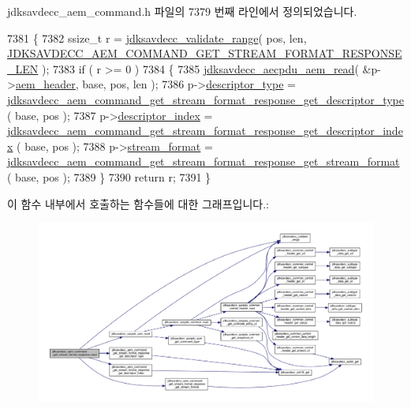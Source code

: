 jdksavdecc\+\_\+aem\+\_\+command.\+h 파일의 7379 번째 라인에서 정의되었습니다.


\begin{DoxyCode}
7381 \{
7382     ssize\_t r = \hyperlink{group__util_ga9c02bdfe76c69163647c3196db7a73a1}{jdksavdecc\_validate\_range}( pos, len, 
      \hyperlink{group__command__get__stream__format__response_gaeb316ba063dd01f9a1b11429a37e2af4}{JDKSAVDECC\_AEM\_COMMAND\_GET\_STREAM\_FORMAT\_RESPONSE\_LEN} 
      );
7383     \textcolor{keywordflow}{if} ( r >= 0 )
7384     \{
7385         \hyperlink{group__aecpdu__aem_gae2421015dcdce745b4f03832e12b4fb6}{jdksavdecc\_aecpdu\_aem\_read}( &p->\hyperlink{structjdksavdecc__aem__command__get__stream__format__response_ae1e77ccb75ff5021ad923221eab38294}{aem\_header}, base, pos, len );
7386         p->\hyperlink{structjdksavdecc__aem__command__get__stream__format__response_ab7c32b6c7131c13d4ea3b7ee2f09b78d}{descriptor\_type} = 
      \hyperlink{group__command__get__stream__format__response_ga241be5e90082adf05f17e1139bc77bc4}{jdksavdecc\_aem\_command\_get\_stream\_format\_response\_get\_descriptor\_type}
      ( base, pos );
7387         p->\hyperlink{structjdksavdecc__aem__command__get__stream__format__response_a042bbc76d835b82d27c1932431ee38d4}{descriptor\_index} = 
      \hyperlink{group__command__get__stream__format__response_ga7563eab7dd358577f64f660404bed6c9}{jdksavdecc\_aem\_command\_get\_stream\_format\_response\_get\_descriptor\_index}
      ( base, pos );
7388         p->\hyperlink{structjdksavdecc__aem__command__get__stream__format__response_a77359be54ea386b1da66597746709ed0}{stream\_format} = 
      \hyperlink{group__command__get__stream__format__response_gaa2b8003ea4005a05570f417601ec000a}{jdksavdecc\_aem\_command\_get\_stream\_format\_response\_get\_stream\_format}
      ( base, pos );
7389     \}
7390     \textcolor{keywordflow}{return} r;
7391 \}
\end{DoxyCode}


이 함수 내부에서 호출하는 함수들에 대한 그래프입니다.\+:
\nopagebreak
\begin{figure}[H]
\begin{center}
\leavevmode
\includegraphics[width=350pt]{group__command__get__stream__format__response_ga5276f0e7a55c3e8acacbd787d2e1cef1_cgraph}
\end{center}
\end{figure}




